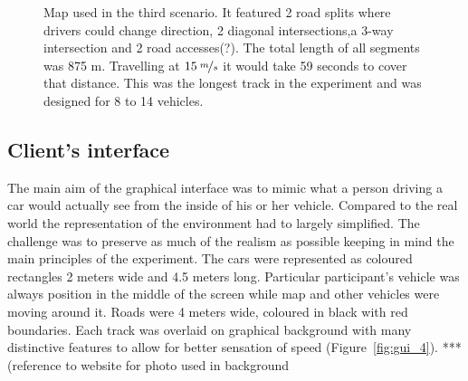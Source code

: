 \documentclass[11pt,english]{article}
\begin{document}
\begin{figure}[H] %
\caption{Map used in the third scenario. It featured 2 road splits where drivers could change direction, 2 diagonal intersections,a 3-way intersection and 2 road accesses(?). The total length of all segments was 875 m. Travelling at $15\:\nicefrac{m}{s}$ it would take 59 seconds to cover that distance. This was the longest track in the experiment and was designed for 8 to 14 vehicles.}
\label{fig:map_3_arrows}
\end{figure}



\subsection{Client's interface}

The main aim of the graphical interface was to mimic what a person driving a car would actually see from the inside of his or her vehicle. Compared to the real world the representation of the environment had to largely simplified. The challenge was to preserve as much of the realism as possible keeping in mind the main principles of the experiment. The cars were represented as coloured rectangles 2 meters wide and 4.5 meters long. Particular participant's vehicle was always position in the middle of the screen while map and other vehicles were moving around it. Roads were 4 meters wide, coloured in black with red boundaries. Each track was overlaid on graphical background with many distinctive features to allow for better sensation of speed (Figure~\ref{fig:gui_4}). ***(reference to website for photo used in background %
\end{document}
